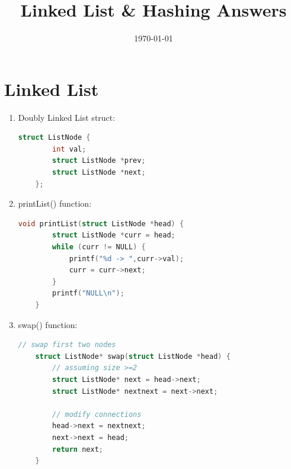 \documentclass[12pt]{article}
\title{Linked List \& Hashing Answers}
\date{\today}
\begin{document}
\maketitle

\section{Linked List}
\begin{enumerate}
    \item Doubly Linked List struct:
    \begin{lstlisting}[language=C]
    struct ListNode {
    	int val;
        struct ListNode *prev;
    	struct ListNode *next;
    };

    \end{lstlisting}

    \item printList() function:
    \begin{lstlisting}[language=C]
    void printList(struct ListNode *head) {
        struct ListNode *curr = head;
        while (curr != NULL) {
            printf("%d -> ",curr->val);
            curr = curr->next;
        }
        printf("NULL\n");
    }
    \end{lstlisting}
    
    \item swap() function:
    \begin{lstlisting}[language=C]
    // swap first two nodes
    struct ListNode* swap(struct ListNode *head) {
        // assuming size >=2
        struct ListNode* next = head->next;
        struct ListNode* nextnext = next->next;
    
        // modify connections
        head->next = nextnext;
        next->next = head;
        return next;
    }
    \end{lstlisting}

\end{enumerate}
\end{document}
